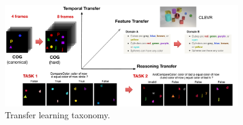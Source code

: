 \begin{figure}[!t]
	\centering
	\includegraphics[width=0.9\textwidth]{../img/architecture/transfer_taxo}
	\caption{Transfer learning taxonomy.}
	\label{fig:taskonomy}\vspace{-10pt}
\end{figure}

